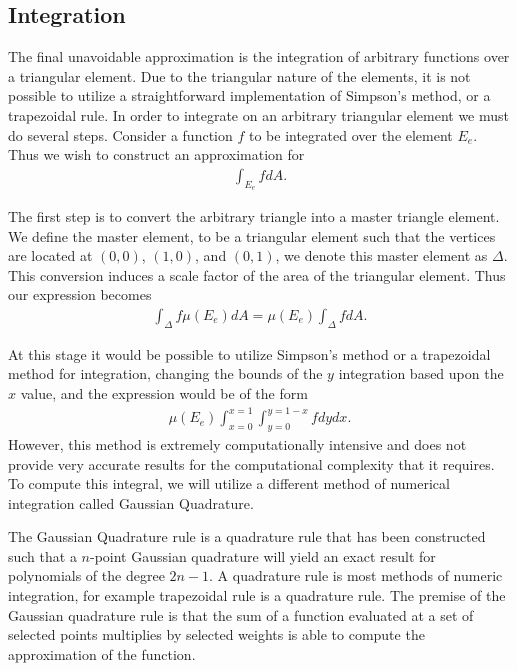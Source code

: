 \documentclass[../fem.tex]{subfile}
\begin{document}
\subsection{Integration}%
\label{sub:integration}

The final unavoidable approximation is the integration of arbitrary functions
over a triangular element. Due to the triangular nature of the elements, it is
not possible to utilize a straightforward implementation of Simpson's method, or
a trapezoidal rule. In order to integrate on an arbitrary triangular element we
must do several steps. Consider a function $f$ to be integrated over the
element $E_e$. Thus we wish to construct an approximation for
\begin{align*}
  \int_{E_e}fdA.
\end{align*}

The first step is to convert the arbitrary triangle into a master triangle
element. We define the master element, to be a triangular element such that the
vertices are located at $(0,0)$, $(1,0)$, and $(0,1)$, we denote this master
element as $\Delta$. This conversion induces a scale factor of the area of the
triangular element. Thus our expression becomes
\begin{align*}
  \int_{\Delta}f\mu\left(E_e\right)dA=\mu\left(E_e\right)\int_{\Delta}fdA.
\end{align*}

At this stage it would be possible to utilize Simpson's method or a trapezoidal
method for integration, changing the bounds of the $y$ integration based upon
the $x$ value, and the expression would be of the form
\begin{align*}
  \mu\left(E_e\right)\int_{x=0}^{x=1}\int_{y=0}^{y=1-x}fdydx.
\end{align*}
However, this method is extremely computationally intensive and does not
provide very accurate results for the computational complexity that it
requires. To compute this integral, we will utilize a different method of
numerical integration called Gaussian Quadrature.

The Gaussian Quadrature rule is a quadrature rule that has been constructed
such that a $n$-point Gaussian quadrature will yield an exact result for
polynomials of the degree $2n-1$. A quadrature rule is most methods of numeric
integration, for example trapezoidal rule is a quadrature rule. The premise of
the Gaussian quadrature rule is that the sum of a function evaluated at a set
of selected points multiplies by selected weights is able to compute the
approximation of the function.
\end{document}
